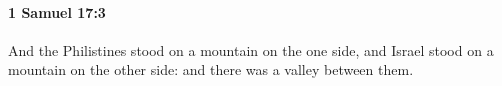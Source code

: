 
		\paragraph{1 Samuel 17:3} %
			\label{1SAMUEL-17-3}

			And the Philistines stood on a mountain on the one side, and Israel stood on a mountain on the other side: and there was a valley between them.



